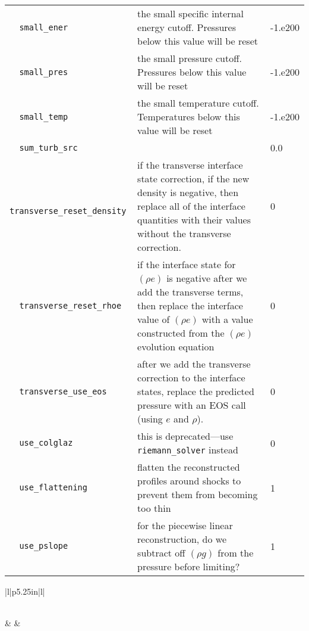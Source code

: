 \begin{landscape}
{\begin{center}
\begin{longtable}{|l|p{5.25in}|l|}
\verb=  small_ener  = &   the small specific internal energy cutoff.  Pressures below this value will be reset  &  -1.e200 \\
\verb=  small_pres  = &   the small pressure cutoff.  Pressures below this value will be reset  &  -1.e200 \\
\rowcolor{tableShade}
\verb=  small_temp  = &   the small temperature cutoff.  Temperatures below this value will be reset  &  -1.e200 \\
\verb=  sum_turb_src  = &    &  0.0 \\
\rowcolor{tableShade}
\verb=  transverse_reset_density  = &   if the transverse interface state correction, if the new density is negative, then replace all of the interface quantities with their values without the transverse correction.  &  0 \\
\verb=  transverse_reset_rhoe  = &   if the interface state for $(\rho e)$ is negative after we add the transverse terms, then replace the interface value of $(\rho e)$ with a value constructed from the $(\rho e)$ evolution equation  &  0 \\
\rowcolor{tableShade}
\verb=  transverse_use_eos  = &   after we add the transverse correction to the interface states, replace the predicted pressure with an EOS call (using $e$ and $\rho$).  &  0 \\
\verb=  use_colglaz  = &   this is deprecated---use {\tt riemann\_solver} instead  &  0 \\
\rowcolor{tableShade}
\verb=  use_flattening  = &   flatten the reconstructed profiles around shocks to prevent them from becoming too thin  &  1 \\
\verb=  use_pslope  = &   for the piecewise linear reconstruction, do we subtract off $(\rho g)$ from the pressure before limiting?  &  1 \\


\end{longtable}
\end{center}

} %


{\small

\renewcommand{\arraystretch}{1.5}
%
\begin{center}
\begin{longtable}{|l|p{5.25in}|l|}
\caption[ parallelization
 parameters.]{ parallelization
 parameters.} \label{table:  parallelization
 parameters. runtime} \\
%
\hline {} & 
        & 
        \\ \hline 
\endfirsthead


\end{longtable}
\end{center}}
\end{landscape}
